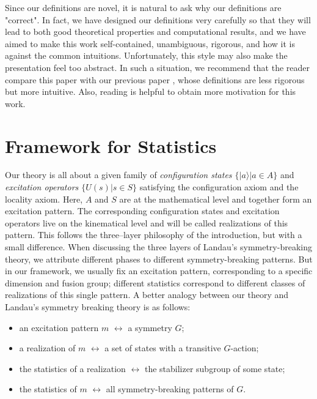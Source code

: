 \documentclass[reprint, amsmath, amssymb, showpacs, floatfix, longbibliography, aps, twocolumn, superscriptaddress, nofootinbib]{revtex4-2}
\theoremstyle{definition}
\begin{document}
Since our definitions are novel, it is natural to ask why our definitions are "correct". In fact, we have designed our definitions very carefully so that they will lead to both good theoretical properties and computational results, and we have aimed to make this work self-contained, unambiguous, rigorous, and how it is against the common intuitions. Unfortunately, this style may also make the presentation feel too abstract. In such a situation, we recommend that the reader compare this paper with our previous paper \cite{Previous}, whose definitions are less rigorous but more intuitive. Also, reading \cite{FHH21} is helpful to obtain more motivation for this work.

\section{Framework for Statistics}\label{sec: Framework}

Our theory is all about a given family of \textit{configuration states $\{|a\rangle|a\in A\}$} and \textit{excitation operators $\{U(s)|s\in S\}$} satisfying the configuration axiom and the locality axiom. Here, $A$ and $S$ are at the mathematical level and together form an excitation pattern. The corresponding configuration states and excitation operators live on the kinematical level and will be called realizations of this pattern. This follows the three–layer philosophy of the introduction, but with a small difference. When discussing the three layers of Landau’s symmetry-breaking theory, we attribute different phases to different symmetry-breaking patterns.
 But in our framework, we usually fix an excitation pattern, corresponding to a specific dimension and fusion group; different statistics correspond to different classes of realizations of this single pattern. A better analogy between our theory and Landau's symmetry breaking theory is as follows: 

\begin{itemize}
	\item an excitation pattern $m$ $\longleftrightarrow$ a symmetry $G$;
	\item a realization of $m$ $\longleftrightarrow$ a set of states with a transitive $G$-action;
	\item the statistics of a realization $\longleftrightarrow$ the stabilizer subgroup of some state;
	\item the statistics of $m$ $\longleftrightarrow$ all symmetry-breaking patterns of $G$.
\end{itemize}
\end{document}
